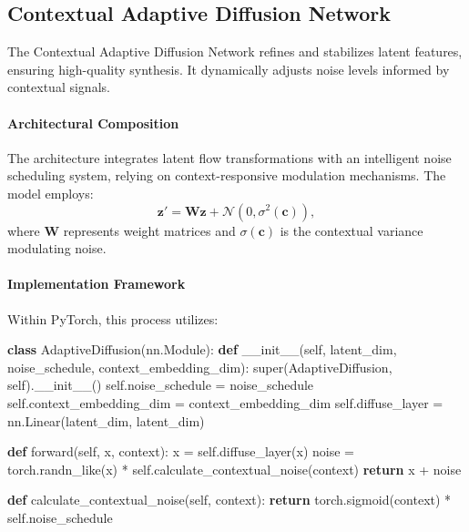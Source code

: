 \documentclass{article} %
\begin{document}
\subsection{Contextual Adaptive Diffusion Network}

The Contextual Adaptive Diffusion Network refines and stabilizes latent features, ensuring high-quality synthesis. It dynamically adjusts noise levels informed by contextual signals.

\paragraph{Architectural Composition}

The architecture integrates latent flow transformations with an intelligent noise scheduling system, relying on context-responsive modulation mechanisms. The model employs:
\begin{equation}
\mathbf{z}' = \mathbf{W} \mathbf{z} + \mathcal{N}(0, \sigma^2(\mathbf{c})),
\end{equation}
where \(\mathbf{W}\) represents weight matrices and \(\sigma(\mathbf{c})\) is the contextual variance modulating noise.

\paragraph{Implementation Framework}

Within PyTorch, this process utilizes:

\begin{algorithm}
\caption{AdaptiveDiffusion}
\label{alg:adaptive_diffusion}
\begin{algorithmic}[1]

\STATE \textbf{class} AdaptiveDiffusion(nn.Module):
\STATE \hspace{0.5cm} \textbf{def} \_\_init\_\_(self, latent\_dim, noise\_schedule, context\_embedding\_dim):
\STATE \hspace{1cm} super(AdaptiveDiffusion, self).\_\_init\_\_()
\STATE \hspace{1cm} self.noise\_schedule = noise\_schedule
\STATE \hspace{1cm} self.context\_embedding\_dim = context\_embedding\_dim
\STATE \hspace{1cm} self.diffuse\_layer = nn.Linear(latent\_dim, latent\_dim)

\STATE
\STATE \hspace{0.5cm} \textbf{def} forward(self, x, context):
\STATE \hspace{1cm} x = self.diffuse\_layer(x)
\STATE \hspace{1cm} noise = torch.randn\_like(x) * self.calculate\_contextual\_noise(context)
\STATE \hspace{1cm} \textbf{return} x + noise

\STATE
\STATE \hspace{0.5cm} \textbf{def} calculate\_contextual\_noise(self, context):
\STATE \hspace{1cm} \textbf{return} torch.sigmoid(context) * self.noise\_schedule

\end{algorithmic}
\end{algorithm}
\end{document}
